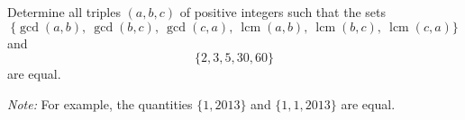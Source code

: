 Determine all triples $(a,b,c)$ of positive integers such that the sets 
$$\Big\{\gcd(a,b),\ \gcd(b,c),\ \gcd(c,a),\ \operatorname{lcm}(a,b),\ \operatorname{lcm}(b,c),\ \operatorname{lcm}(c,a)\Big\}$$
and $$\{2, 3, 5, 30, 60\}$$ are equal.

\emph{Note:} For example, the quantities $\{1,2013\}$ and $\{1,1,2013\}$ are equal.
